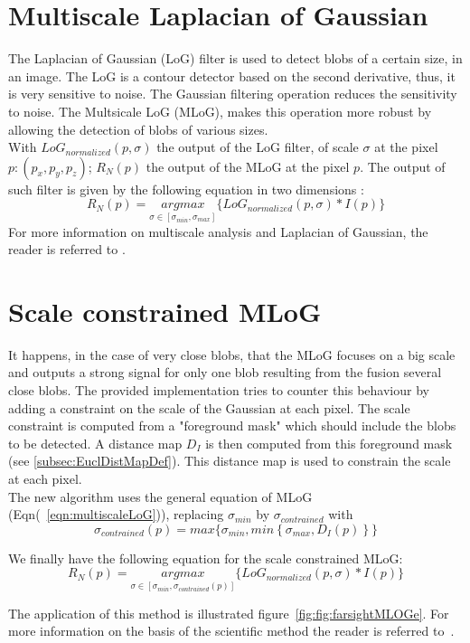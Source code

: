 \section{Multiscale Laplacian of Gaussian}
The Laplacian of Gaussian (LoG) filter is used to detect blobs of a certain size, in an image. The LoG is a contour detector based on the second derivative, thus, it is very sensitive to noise. The Gaussian filtering operation reduces the sensitivity to noise.
The Multsicale LoG (MLoG), makes this operation more robust by allowing the detection of blobs of various sizes.\\

With \(LoG_{normalized}(p,\sigma)\) the output of the LoG filter, of scale {\({\sigma}\)}  at the pixel {\({p : (p_x, p_y, p_z)}\)};
 \({R_N(p)}\) the output of the MLoG at the pixel {\({p}\)}.
The output of such filter is given by the following equation in two dimensions :
\begin{equation}
\label{eqn:multiscaleLoG}
R_N(p) = \underset{\sigma \in [\sigma _{min},\sigma _{max} ] }{argmax} \Big\lbrace LoG_{normalized}(p,\sigma) \ast I(p) \Big\rbrace 
\end{equation}
For more information on multiscale analysis and Laplacian of Gaussian, the reader is referred to \cite{lindeberg1998feature}.


\section{Scale constrained MLoG}

It happens, in the case of very close blobs, that the MLoG focuses on a big scale and outputs a strong signal
for only one blob resulting from the fusion several close blobs.
The provided implementation tries to counter this behaviour by adding a constraint on the scale of the Gaussian at each pixel.
The scale constraint is computed from a "foreground mask" which should include the blobs to be detected. A distance map $ D_{I} $ is then computed from this foreground mask (see \ref{subsec:EuclDistMapDef}). This distance map is used to constrain the scale at each pixel.\\

The new algorithm uses the general equation of MLoG (Eqn(~\ref{eqn:multiscaleLoG})), replacing $\sigma _{min}$ by $\sigma _{contrained}$ with
\begin{equation}
\label{eqn:ScaleConstraint}
 \sigma _{contrained}(p)= max \Big\lbrace {\sigma _{min},min  \left\lbrace {\sigma _{max} , D_{I}(p)} \right\rbrace} \Big\rbrace  
\end{equation}

We finally have the following equation for the scale constrained MLoG:
\begin{equation}
\label{eqn:ScaleConstraintMLoG}
R_N(p) = \underset{\sigma \in [\sigma _{min},\sigma _{contrained}(p) ] }{argmax} \Big\lbrace LoG_{normalized}(p,\sigma) \ast I(p) \Big\rbrace 
\end{equation}

The application of this method is illustrated figure~\ref{fig:fig:farsightMLOGe}.
For more information on the basis of the scientific method the reader is referred to~\cite{al2009improved}.

